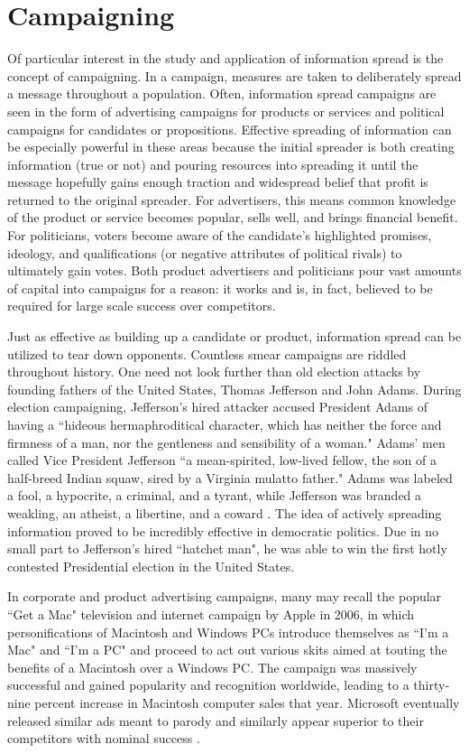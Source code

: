 \section{Campaigning}
Of particular interest in the study and application of information spread is the concept of campaigning. In a campaign, measures are taken to deliberately spread a message throughout a population. Often, information spread campaigns are seen in the form of advertising campaigns for products or services and political campaigns for candidates or propositions. Effective spreading of information can be especially powerful in these areas because the initial spreader is both creating information (true or not) and pouring resources into spreading it until the message hopefully gains enough traction and widespread belief that profit is returned to the original spreader. For advertisers, this means common knowledge of the product or service becomes popular, sells well, and brings financial benefit. For politicians, voters become aware of the candidate's highlighted promises, ideology, and qualifications (or negative attributes of political rivals) to ultimately gain votes. Both product advertisers and politicians pour vast amounts of capital into campaigns for a reason: it works and is, in fact, believed to be required for large scale success over competitors. 

Just as effective as building up a candidate or product, information spread can be utilized to tear down opponents. Countless smear campaigns are riddled throughout history. One need not look further than old election attacks by founding fathers of the United States, Thomas Jefferson and John Adams. During election campaigning, Jefferson's hired attacker accused President Adams of having a ``hideous hermaphroditical character, which has neither the force and firmness of a man, nor the gentleness and sensibility of a woman." Adams' men called Vice President Jefferson ``a mean-spirited, low-lived fellow, the son of a half-breed Indian squaw, sired by a Virginia mulatto father." Adams was labeled a fool, a hypocrite, a criminal, and a tyrant, while Jefferson was branded a weakling, an atheist, a libertine, and a coward \cite{cnnffcampaign}. The idea of actively spreading information proved to be incredibly effective in democratic politics. Due in no small part to Jefferson's hired ``hatchet man", he was able to win the first hotly contested Presidential election in the United States. 

In corporate and product advertising campaigns, many may recall the popular ``Get a Mac" television and internet campaign by Apple in 2006, in which personifications of Macintosh and Windows PCs introduce themselves as ``I'm a Mac" and ``I'm a PC" and proceed to act out various skits aimed at touting the benefits of a Macintosh over a Windows PC. The campaign was massively successful and gained popularity and recognition worldwide, leading to a thirty-nine percent increase in Macintosh computer sales that year. Microsoft eventually released similar ads meant to parody and similarly appear superior to their competitors with nominal success \cite{getamac2016}. 

